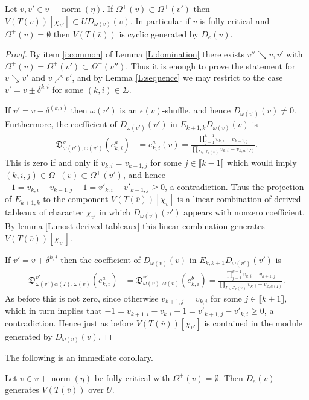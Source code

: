 \documentclass[11pt,fleqn]{article}
\newcommand\DD{\mathfrak D}
\newcommand\I{\mathcal I}
\newcommand\interval[1]{\llbracket #1 \rrbracket}
\DeclareMathOperator\n{norm}
\begin{document}
\begin{Proposition}
Let $v,v' \in \overline v + \n(\eta)$. If $\Omega^+(v) \subset \Omega^+(v')$ 
then $V(T(\overline v))[\chi_{v'}] \subset U D_{\omega(v)}(v)$. In particular
if $v$ is fully critical and $\Omega^+(v) = \emptyset$ then $V(T(\overline v))$
is cyclic generated by $D_e(v)$.
\end{Proposition}
\begin{proof}
By item \ref{i:common} of Lemma \ref{L:domination} there exists $v'' \searrow 
v, v'$ with $\Omega^+(v) = \Omega^+(v') \subset \Omega^+(v'')$. Thus it is 
enough to prove the statement for $v \searrow v'$ and $v \nearrow v'$, and by 
Lemma \ref{L:sequence} we may restrict to the case $v' = v \pm \delta^{k,i}$ 
for some $(k,i) \in \Sigma$. 

If $v' = v - \delta^{(k,i)}$ then $\omega(v')$ is an $\epsilon(v)$-shuffle, 
and hence $D_{\omega(v')}(v) \neq 0$. Furthermore, the coefficient of 
$D_{\omega(v')}(v')$ in $E_{k+1,k} D_{\omega(v)}(v)$ is
\begin{align*}
\DD_{\omega(v'), \omega(v')}^v(e_{k,i}^a)
	&= e_{k,i}^a(v) 
		= \frac{\prod_{j=1}^{k-1} v_{k,i} - v_{k-1,j}}
			{\prod_{I \in \I_k(v)} v_{k,i} - v_{k, a(I)}}.
\end{align*}
This is zero if and only if $v_{k,i} = v_{k-1, j}$ for some $j \in \interval 
{k-1}$ which would imply $(k,i,j) \in \Omega^+(v) \subset \Omega^+(v')$,
and hence $-1 = v_{k,i} - v_{k-1,j} -1 = v'_{k,i} - v'_{k-1,j}  \geq 0$, a
contradiction. Thus the projection of $E_{k+1,k}$ to the component 
$V(T(\overline v))[\chi_v]$ is a linear combination of derived tableaux of
character $\chi_{v'}$ in which $D_{\omega(v')}(v')$ appears with nonzero
coefficient. By lemma \ref{L:most-derived-tableaux} this linear combination
generates $V(T(\overline v))[\chi_{v'}]$.

If $v' = v + \delta^{k,i}$ then the coefficient of $D_{\omega(v)}(v)$ in
$E_{k,k+1} D_{\omega(v')}(v')$ is
\begin{align*}
\DD_{\omega(v')\alpha(I), \omega(v)}^{v'}(e_{k,i}^a)
	&= \DD_{\omega(v),\omega(v)}^{v'}(e_{k,i}^b)
		= \frac{\prod_{j=1}^{k+1} v_{k,i} - v_{k+1,j}}
			{\prod_{I \in \I_k(v)} v_{k,i} - v_{k, a(I)}}.
\end{align*}
As before this is not zero, since otherwise $v_{k+1,j} = v_{k,i}$ for some
$j \in \interval{k+1}$, which in turn implies that $-1 = v_{k+1,i} - v_{k,i}
-1 = v'_{k+1,j} - v'_{k,i} \geq 0$, a contradiction. Hence just as before
$V(T(\overline v))[\chi_{v'}]$ is contained in the module generated by 
$D_{\omega(v)}(v)$.
\end{proof}
The following is an immediate corollary.
\begin{Corollary*}
Let $v \in \overline v + \n(\eta)$ be fully critical with $\Omega^+(v) = 
\emptyset$. Then $D_e(v)$ generates $V(T(\overline v))$ over $U$.
\end{Corollary*}

\begin{bibdiv}
\begin{biblist}
\end{biblist}
\end{bibdiv}
\end{document}
